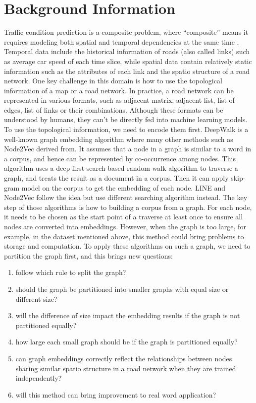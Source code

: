 \documentclass[11pt]{article}
\begin{document}
\section{Background Information}
Traffic condition prediction is a composite problem, where ``composite'' means it requires modeling both spatial and temporal dependencies at the same time \cite{yao2019revisiting}. Temporal data include the historical information of roads (also called links) such as average car speed of each time slice, while spatial data contain relatively static information such as the attributes of each link and the spatio structure of a road network. One key challenge in this domain is how to use the topological information of a map or a road network. In practice, a road network can be represented in various formats, such as adjacent matrix, adjacent list, list of edges, list of links or their combinations. Although these formats can be understood by humans, they can't be directly fed into machine learning models. To use the topological information, we need to encode them first. DeepWalk \cite{perozzi2014deepwalk} is a well-known graph embedding algorithm where many other methods such as Node2Vec \cite{grover2016node2vec} derived from. It assumes that a node in a graph is similar to a word in a corpus, and hence can be represented by co-occurrence among nodes. This algorithm uses a deep-first-search based random-walk algorithm to traverse a graph, and treats the result as a document in a corpus. Then it can apply skip-gram model \cite{mikolov2013efficient} on the corpus to get the embedding of each node. LINE \cite{tang2015line} and Node2Vec \cite{grover2016node2vec} follow the idea but use different searching algorithm instead. The key step of those algorithms is how to building a corpus from a graph. For each node, it needs to be chosen as the start point of a traverse at least once to ensure all nodes are converted into embeddings. However, when the graph is too large, for example, in the dataset mentioned above, this method could bring problems to storage and computation. To apply these algorithms on such a graph, we need to partition the graph first, and this brings new questions: 
\begin{enumerate}
  \item follow which rule to split the graph? 
  \item should the graph be partitioned into smaller graphs with equal size or different size?
  \item will the difference of size impact the embedding results if the graph is not partitioned equally?
  \item how large each small graph should be if the graph is partitioned equally?
  \item can graph embeddings correctly reflect the relationships between nodes sharing similar spatio structure in a road network when they are trained independently?
  \item will this method can bring improvement to real word application?
\end{enumerate}
\end{document}
